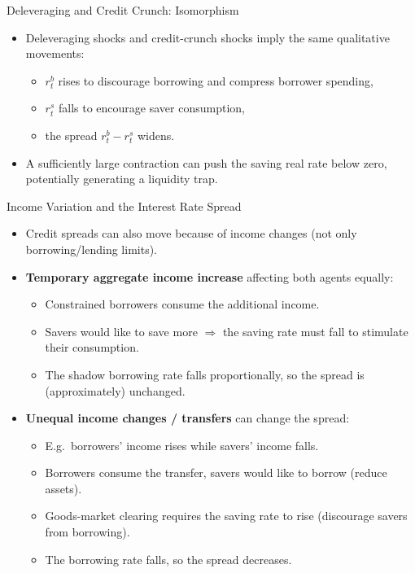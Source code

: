 \documentclass[11pt,aspectratio=169]{beamer}
\begin{document}
\begin{frame}{Deleveraging and Credit Crunch: Isomorphism}
\small
\begin{itemize}
  \item Deleveraging shocks and credit-crunch shocks imply the same qualitative movements:
  \begin{itemize}
    \item $r_t^b$ rises to discourage borrowing and compress borrower spending,
    \item $r_t^s$ falls to encourage saver consumption,
    \item the spread $r_t^b-r_t^s$ widens.
  \end{itemize}
  \vspace{0.25em}
  \item A sufficiently large contraction can push the saving real rate below zero,
  potentially generating a liquidity trap.
  
\end{itemize}
\end{frame}

\begin{frame}{Income Variation and the Interest Rate Spread}
\small
\begin{itemize}
  \item Credit spreads can also move because of income changes (not only borrowing/lending limits).
  \vspace{0.25em}
  \item \textbf{Temporary aggregate income increase} affecting both agents equally:
  \begin{itemize}
    \item Constrained borrowers consume the additional income.
    \item Savers would like to save more $\Rightarrow$ the saving rate must fall to stimulate their consumption.
    \item The shadow borrowing rate falls proportionally, so the spread is (approximately) unchanged.
  \end{itemize}
  \vspace{0.25em}
  \item \textbf{Unequal income changes / transfers} can change the spread:
  \begin{itemize}
    \item E.g.\ borrowers' income rises while savers' income falls.
    \item Borrowers consume the transfer, savers would like to borrow (reduce assets).
    \item Goods-market clearing requires the saving rate to rise (discourage savers from borrowing).
    \item The borrowing rate falls, so the spread decreases.
  \end{itemize}
\end{itemize}
\end{frame}
\end{document}
